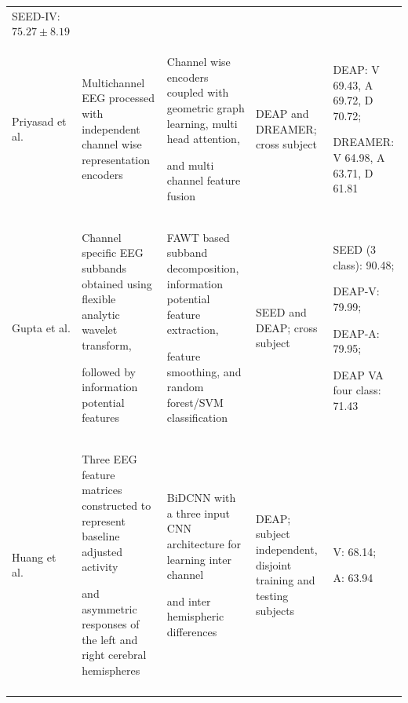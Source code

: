 \documentclass[ASNA,twocolumn]{USG}
\newcommand{\lightrowsep}{%
  \arrayrulecolor{lightrowgray}%
  \specialrule{0.30pt}{3.5pt}{3.5pt}%
  \arrayrulecolor{black}%
}
\begin{document}
\begin{table}
\begin{tabularx}{\textheight}{>{\raggedright\arraybackslash}p{3.15cm}>{\raggedright\arraybackslash}X>{\raggedright\arraybackslash}X>{\raggedright\arraybackslash}p{3.45cm}>{\raggedright\arraybackslash}p{5.0cm}}
SEED-IV: $75.27 \pm 8.19$ \\

\lightrowsep

Priyasad et al. \cite{priyasad2022affect} &

Multichannel EEG processed with independent channel wise representation encoders &

Channel wise encoders coupled with geometric graph learning, multi head attention,

and multi channel feature fusion &

DEAP and DREAMER; cross subject &

DEAP: V 69.43, A 69.72, D 70.72;

DREAMER: V 64.98, A 63.71, D 61.81 \\

\lightrowsep

Gupta et al. \cite{gupta2018cross} &

Channel specific EEG subbands obtained using flexible analytic wavelet transform,

followed by information potential features &

FAWT based subband decomposition, information potential feature extraction,

feature smoothing, and random forest/SVM classification &

SEED and DEAP; cross subject &

SEED (3 class): 90.48;

DEAP-V: 79.99;

DEAP-A: 79.95;

DEAP VA four class: 71.43 \\

\lightrowsep

Huang et al. \cite{huang2021differences} &

Three EEG feature matrices constructed to represent baseline adjusted activity

and asymmetric responses of the left and right cerebral hemispheres &

BiDCNN with a three input CNN architecture for learning inter channel

and inter hemispheric differences &

DEAP; subject independent, disjoint training and testing subjects &

V: 68.14;

A: 63.94 \\

\lightrowsep


\end{tabularx}
\end{table}
\end{document}
